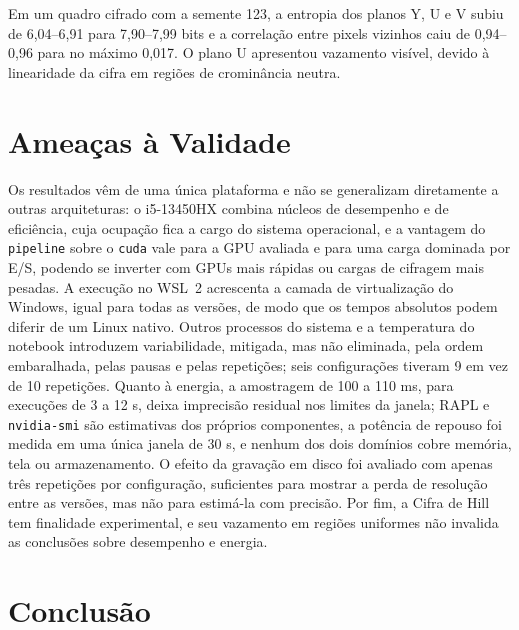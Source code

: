 \documentclass[12pt]{article}
\begin{document}
Em um quadro cifrado com a semente 123, a entropia dos planos Y, U e V subiu de
6,04--6,91 para 7,90--7,99 bits e a correlação entre pixels vizinhos caiu de
0,94--0,96 para no máximo 0,017. O plano U apresentou vazamento visível, devido
à linearidade da cifra em regiões de crominância neutra.


\section{Ameaças à Validade}

Os resultados vêm de uma única plataforma e não se generalizam diretamente a
outras arquiteturas: o i5-13450HX combina núcleos de desempenho e de
eficiência, cuja ocupação fica a cargo do sistema operacional, e a vantagem do
\texttt{pipeline} sobre o \texttt{cuda} vale para a GPU avaliada e para uma
carga dominada por E/S, podendo se inverter com GPUs mais rápidas ou cargas de
cifragem mais pesadas. A execução no WSL~2 acrescenta a camada de
virtualização do Windows, igual para todas as versões, de modo que os tempos
absolutos podem diferir de um Linux nativo. Outros processos do sistema e a
temperatura do notebook introduzem variabilidade, mitigada, mas não eliminada,
pela ordem embaralhada, pelas pausas e pelas repetições; seis configurações
tiveram 9 em vez de 10 repetições. Quanto à energia, a amostragem de 100 a
110 ms, para execuções de 3 a 12 s, deixa imprecisão residual nos limites da
janela; RAPL e \texttt{nvidia-smi} são estimativas dos próprios componentes, a
potência de repouso foi medida em uma única janela de 30 s, e nenhum dos dois
domínios cobre memória, tela ou armazenamento. O efeito da gravação em disco
foi avaliado com apenas três repetições por configuração, suficientes para
mostrar a perda de resolução entre as versões, mas não para estimá-la com
precisão. Por fim, a Cifra de Hill tem finalidade experimental, e seu vazamento
em regiões uniformes não invalida as conclusões sobre desempenho e energia.


\section{Conclusão}
\end{document}
